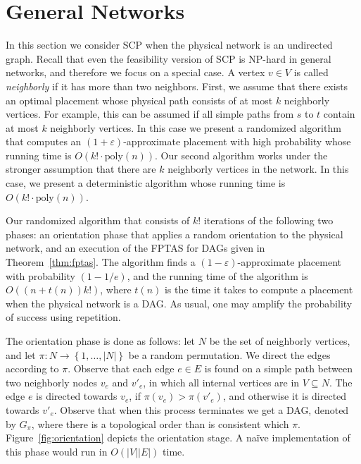 \documentclass[runningheads]{llncs}
\newcommand{\set}[1]{\left\{ #1 \right\}}
\newcommand{\abs}[1]{\left| #1 \right|}
\newcommand{\eps}{\varepsilon}
\newcommand{\scp}{\textsc{SCP}\xspace}
\begin{document}

\section{General Networks}
\label{sec:general}

In this section we consider \scp when the physical network is an
undirected graph.  Recall that even the feasibility version of \scp is
NP-hard in general networks, and therefore we focus on a special case.
%
A vertex $v \in V$ is called \emph{neighborly} if it has more than two
neighbors.
%
First, we assume that there exists an optimal placement whose physical
path consists of at most $k$ neighborly vertices.  For example, this
can be assumed if all simple paths from $s$ to $t$ contain at most $k$
neighborly vertices.  In this case we present a randomized algorithm
that computes an $(1+\eps)$-approximate placement with high
probability whose running time is $O(k! \cdot \text{poly}(n))$.
%
Our second algorithm works under the stronger assumption that there
are $k$ neighborly vertices in the network.  In this case, we present
a deterministic algorithm whose running time is $O(k! \cdot
\text{poly}(n))$.


Our randomized algorithm that consists of $k!$ iterations of the
following two phases: an orientation phase that applies a random
orientation to the physical network, and an execution of the FPTAS for
DAGs given in Theorem~\ref{thm:fptas}.  The algorithm finds a
$(1-\eps)$-approximate placement with probability $(1-1/e)$, and the
running time of the algorithm is $O((n+t(n))k!)$, where $t(n)$ is the
time it takes to compute a placement when the physical network is a
DAG.
%
As usual, one may amplify the probability of success using repetition.

The orientation phase is done as follows: let $N$ be the set of
neighborly vertices, and let $\pi:N \to \set{1,\ldots,\abs{N}}$ be a
random permutation.  We direct the edges according to $\pi$.  Observe
that each edge $e \in E$ is found on a simple path between two
neighborly nodes $v_e$ and $v'_e$, in which all internal vertices are
in $V \subseteq N$.  The edge $e$ is directed towards $v_e$, if
$\pi(v_e) > \pi(v'_e)$, and otherwise it is directed towards $v'_e$.
%
Observe that when this process terminates we get a DAG, denoted by
$G_\pi$, where there is a topological order than is consistent which
$\pi$.  Figure~\ref{fig:orientation} depicts the orientation stage.
%
A na\"ive implementation of this phase would run in $O(|V||E|)$ time.
\end{document}
